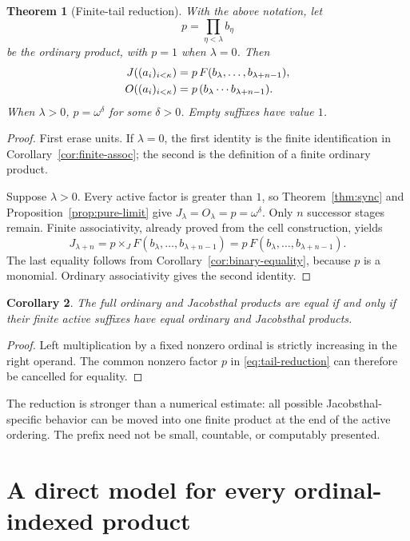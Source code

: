 \documentclass[11pt,letterpaper]{article}
\newtheorem{theorem}{Theorem}[section]
\newtheorem{corollary}[theorem]{Corollary}
\theoremstyle{definition}
\theoremstyle{remark}
\newcommand{\J}{\mathbin{\times_{\!J}}}
\begin{document}
\begin{theorem}[Finite-tail reduction]\label{thm:tail-reduction}
With the above notation, let
\[
 p=\prod_{\eta<\lambda}b_\eta
\]
be the ordinary product, with $p=1$ when $\lambda=0$. Then
\begin{align}\label{eq:tail-reduction}
 J((a_i)_{i<\kappa})
    &=p\,F(b_\lambda,\ldots,b_{\lambda+n-1}),\notag\\
 O((a_i)_{i<\kappa})
    &=p\,(b_\lambda\cdots b_{\lambda+n-1}).
\end{align}
When $\lambda>0$, $p=\omega^\delta$ for some $\delta>0$. Empty suffixes
have value $1$.
\end{theorem}

\begin{proof}
First erase units. If $\lambda=0$, the first identity is the finite
identification in Corollary~\ref{cor:finite-assoc}; the second is the
definition of a finite ordinary product.

Suppose $\lambda>0$. Every active factor is greater than $1$, so
Theorem~\ref{thm:sync} and Proposition~\ref{prop:pure-limit} give
$J_\lambda=O_\lambda=p=\omega^\delta$. Only $n$ successor stages remain.
Finite associativity, already proved from the cell construction, yields
\[
 J_{\lambda+n}
   =p\J F(b_\lambda,\ldots,b_{\lambda+n-1})
   =p\,F(b_\lambda,\ldots,b_{\lambda+n-1}).
\]
The last equality follows from Corollary~\ref{cor:binary-equality}, because
$p$ is a monomial. Ordinary associativity gives the second identity.
\end{proof}

\begin{corollary}\label{cor:equality-tail}
The full ordinary and Jacobsthal products are equal if and only if their
finite active suffixes have equal ordinary and Jacobsthal products.
\end{corollary}

\begin{proof}
Left multiplication by a fixed nonzero ordinal is strictly increasing
in the right operand. The common nonzero factor $p$ in
\eqref{eq:tail-reduction} can therefore be cancelled for equality.
\end{proof}

The reduction is stronger than a numerical estimate: all possible
Jacobsthal-specific behavior can be moved into one finite product at the
end of the active ordering. The prefix need not be small, countable, or
computably presented.

\section{A direct model for every ordinal-indexed product}\label{sec:transfinite}
\end{document}
